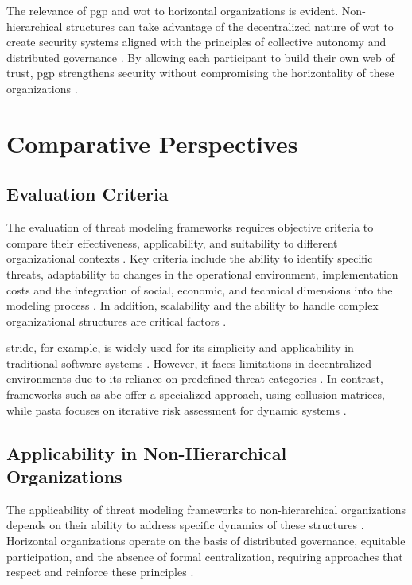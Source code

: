 The relevance of \gls{pgp} and \gls{wot} to horizontal organizations is evident.
Non-hierarchical structures can take advantage of the
decentralized nature of \gls{wot} to create security systems aligned with the
principles of collective autonomy and distributed governance . By allowing each
participant to build their own web of trust, \gls{pgp} strengthens security
without compromising the horizontality of these organizations
\cite{EverydayRevolutions, Colbac}.

\section{Comparative Perspectives}
\label{sec:comparative_perspectives}

\subsection{Evaluation Criteria}
\label{subsec:evaluation_criteria}

The evaluation of threat modeling frameworks requires objective criteria to
compare their effectiveness, applicability, and suitability to different
organizational contexts \cite{EvaluationofCompetingThreatModeling}. Key criteria
include the ability to identify specific threats, adaptability to changes in the
operational environment, implementation costs and the integration of social,
economic, and technical dimensions into the modeling process
\cite{ThreatModelingASystematicLiteratureReview}. In addition, scalability and
the ability to handle complex organizational structures are critical factors
\cite{AbcCrypto}.

\gls{stride}, for example, is widely used for its simplicity and applicability
in traditional software systems \cite{ThreatModelingdesigningForSecurity}.
However, it faces limitations in decentralized environments due to its reliance on
predefined threat categories \cite{STRIDEthreatmodelingforcyberphysical}. In contrast,
frameworks such as \gls{abc} offer a specialized approach, using collusion
matrices, while \gls{pasta} focuses on iterative risk assessment for dynamic systems
\cite{AbcCrypto, RiskCentricThreatModeling}.

\subsection{Applicability in Non-Hierarchical Organizations}
\label{subsec:applicability_nonhierarchical_orgs}

The applicability of threat modeling frameworks to non-hierarchical
organizations depends on their ability to address specific dynamics of these
structures \cite{Colbac, ThreatModelingASystematicLiteratureReview}. Horizontal
organizations operate on the basis of distributed governance, equitable
participation, and the absence of formal centralization, requiring approaches
that respect and reinforce these principles \cite{EverydayRevolutions}.

